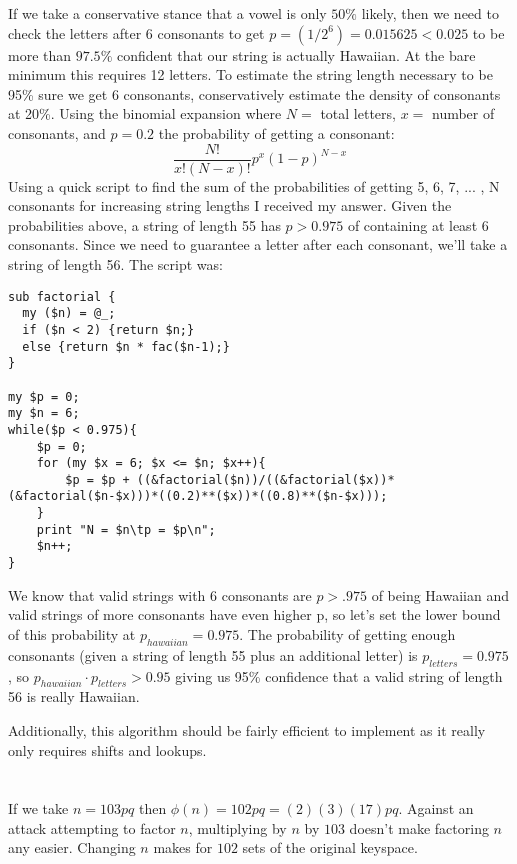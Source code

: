 \documentclass[]{article}
\begin{document}
If we take a conservative stance that a vowel is only $50\%$ likely, then we need to check the letters after 6 consonants to get $p = (1/2^6) = 0.015625 < 0.025$ to be more than $97.5\%$ confident that our string is actually Hawaiian.  At the bare minimum this requires 12 letters.  To estimate the string length necessary to be 95\% sure we get 6 consonants, conservatively estimate the density of consonants at 20\%.  Using the binomial expansion where $N=$ total letters, $x=$ number of consonants, and $p=0.2$ the probability of getting a consonant:
$$\frac{N!}{x! (N-x)!}p^x (1-p)^{N-x}$$
Using a quick script to find the sum of the probabilities of getting 5, 6, 7, ... , N consonants for increasing string lengths I received my answer.  Given the probabilities above, a string of length 55 has $p > 0.975$ of containing at least 6 consonants.  Since we need to guarantee a letter after each consonant, we'll take a string of length 56. The script was:
\begin{small}
\begin{verbatim}
sub factorial {
  my ($n) = @_;
  if ($n < 2) {return $n;}
  else {return $n * fac($n-1);}
}

my $p = 0;
my $n = 6;
while($p < 0.975){
	$p = 0;
	for (my $x = 6; $x <= $n; $x++){
		$p = $p + ((&factorial($n))/((&factorial($x))*(&factorial($n-$x)))*((0.2)**($x))*((0.8)**($n-$x)));
	}
	print "N = $n\tp = $p\n";
	$n++;
}
\end{verbatim}
\end{small}

We know that valid strings with 6 consonants are $p>.975$ of being Hawaiian and valid strings of more consonants have even higher p, so let's set the lower bound of this probability at $p_{hawaiian} = 0.975$.  The probability of getting enough consonants (given a string of length 55 plus an additional letter) is $p_{letters} = 0.975$, so $p_{hawaiian} \cdot p_{letters} > 0.95$ giving us 95\% confidence that a valid string of length 56 is really Hawaiian.

Additionally, this algorithm should be fairly efficient to implement as it really only requires shifts and lookups.


\section{}
\subsection{}
If we take $n = 103pq$ then $\phi(n) = 102pq = (2)(3)(17)pq$.  Against an attack attempting to factor $n$, multiplying by $n$ by $103$ doesn't make factoring $n$ any easier.  Changing $n$ makes for $102$ sets of the original keyspace.
\end{document}
